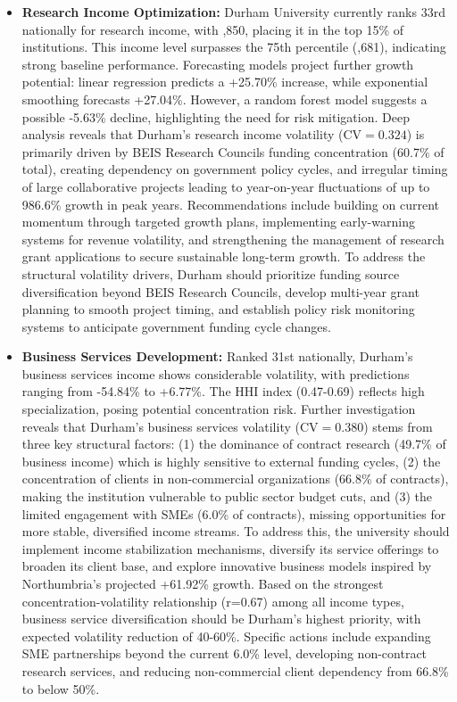 \documentclass[journal,onecolumn, 10pt,draftclsnofoot]{IEEEtran}
\begin{document}
\begin{itemize}
    \item \textbf{Research Income Optimization:} Durham University currently ranks 33rd nationally for research income, with ,850, placing it in the top 15\% of institutions. This income level surpasses the 75th percentile (,681), indicating strong baseline performance. Forecasting models project further growth potential: linear regression predicts a +25.70\% increase, while exponential smoothing forecasts +27.04\%. However, a random forest model suggests a possible -5.63\% decline, highlighting the need for risk mitigation. Deep analysis reveals that Durham's research income volatility ($\mathrm{CV}=0.324$) is primarily driven by BEIS Research Councils funding concentration (60.7\% of total), creating dependency on government policy cycles, and irregular timing of large collaborative projects leading to year-on-year fluctuations of up to 986.6\% growth in peak years. Recommendations include building on current momentum through targeted growth plans, implementing early-warning systems for revenue volatility, and strengthening the management of research grant applications to secure sustainable long-term growth. To address the structural volatility drivers, Durham should prioritize funding source diversification beyond BEIS Research Councils, develop multi-year grant planning to smooth project timing, and establish policy risk monitoring systems to anticipate government funding cycle changes.
      
    \item \textbf{Business Services Development:} Ranked 31st nationally, Durham's business services income shows considerable volatility, with predictions ranging from -54.84\% to +6.77\%. The HHI index (0.47-0.69) reflects high specialization, posing potential concentration risk. Further investigation reveals that Durham's business services volatility ($\mathrm{CV}=0.380$) stems from three key structural factors: (1) the dominance of contract research (49.7\% of business income) which is highly sensitive to external funding cycles, (2) the concentration of clients in non-commercial organizations (66.8\% of contracts), making the institution vulnerable to public sector budget cuts, and (3) the limited engagement with SMEs (6.0\% of contracts), missing opportunities for more stable, diversified income streams. To address this, the university should implement income stabilization mechanisms, diversify its service offerings to broaden its client base, and explore innovative business models inspired by Northumbria's projected +61.92\% growth. Based on the strongest concentration-volatility relationship (r=0.67) among all income types, business service diversification should be Durham's highest priority, with expected volatility reduction of 40-60\%. Specific actions include expanding SME partnerships beyond the current 6.0\% level, developing non-contract research services, and reducing non-commercial client dependency from 66.8\% to below 50\%.
    

\end{itemize}
\end{document}
